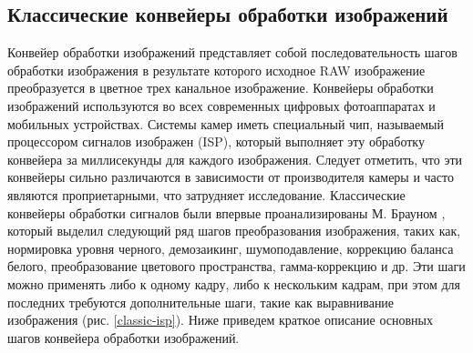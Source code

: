 \subsection{Классические конвейеры обработки изображений}\label{sect-2-1}

Конвейер обработки изображений представляет собой последовательность шагов обработки изображения в результате которого исходное RAW изображение преобразуется в цветное трех канальное изображение. Конвейеры обработки изображений используются во всех современных цифровых фотоаппаратах и мобильных устройствах. Системы камер
иметь специальный чип, называемый процессором сигналов изображен (ISP), который выполняет эту обработку конвейера за миллисекунды для каждого изображения. Следует отметить, что эти конвейеры сильно различаются в зависимости от производителя камеры и часто являются проприетарными, что затрудняет исследование.  Классические конвейеры обработки сигналов были впервые проанализированы М. Брауном \cite{lib-borwn}, который выделил следующий ряд шагов преобразования изображения, таких как, нормировка уровня черного, демозаикинг, шумоподавление, коррекцию баланса белого, преобразование цветового пространства, гамма-коррекцию и др. Эти шаги можно применять либо к одному кадру, либо к нескольким кадрам, при этом для последних требуются дополнительные шаги, такие как выравнивание изображения (рис. \ref{classic-isp}). Ниже приведем краткое описание основных шагов конвейера обработки изображений.


